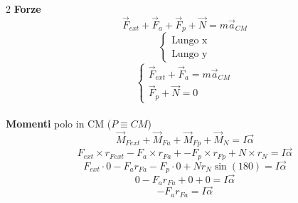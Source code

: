 \documentclass[twoside]{article}
\begin{document}
\begin{multicols}{2}
  \textbf{Forze}
  \begin{equation*}
    \vec{F}_{ext} + \vec{F}_{a} + \vec{F}_p + \vec{N} = m \vec{a}_{CM}
  \end{equation*}
  \begin{equation*}
    \begin{cases}
      \text{Lungo x} \\
      \text{Lungo y}
    \end{cases}
  \end{equation*}
  \begin{equation*}
    \begin{cases}
      \vec{F}_{ext} + \vec{F}_{a} = m \vec{a}_{CM} \\
      \vec{F}_p + \vec{N} = 0
    \end{cases}
  \end{equation*}
  \columnbreak
  \noindent
  \\
  \textbf{Momenti} polo in CM (\(P \equiv CM\))
  \begin{equation*}
    \vec{M}_{Fext} + \vec{M}_{Fa} + \vec{M}_{Fp} + \vec{M}_{N} = I \vec{\alpha}
  \end{equation*}
  \begin{equation*}
    F_{ext} \times r_{Fext} - F_{a} \times r_{Fa}  +  - F_p \times r_{Fp} + N \times r_{N} = I \vec{\alpha}
  \end{equation*}
  \begin{equation*}
    F_{ext}  \cdot 0 - F_{a}  r_{Fa} - F_p \cdot 0 + N r_{N} \sin{(180)} = I \vec{\alpha}
  \end{equation*}
  \begin{equation*}
    0 - F_{a} r_{Fa} + 0 + 0 = I \vec{\alpha}
  \end{equation*}
  \begin{equation*}
    - F_{a} r_{Fa} = I \vec{\alpha}
  \end{equation*}
\end{multicols}
\end{document}
